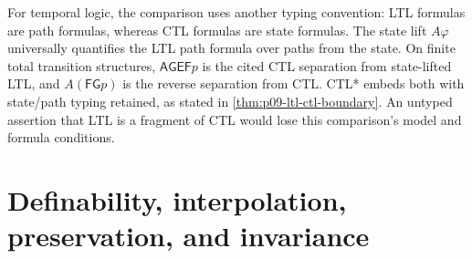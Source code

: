 For temporal logic, the comparison uses another typing convention:
LTL formulas are path formulas, whereas CTL formulas are state formulas.
The state lift \(A\varphi\) universally quantifies the LTL path formula
over paths from the state. On finite total transition structures,
\(\mathsf{AG}\mathsf{EF}p\) is the cited CTL separation from state-lifted
LTL, and \(A(\mathsf F\mathsf Gp)\) is the reverse separation from CTL.
CTL* embeds both with state/path typing retained, as stated in
\cref{thm:p09-ltl-ctl-boundary}\cite{EmersonHalpern1986}.
An untyped assertion that LTL is a fragment of CTL would lose this comparison's
model and formula conditions.

\section{Definability, interpolation, preservation, and invariance}
\label{sec:p14-translation-definability-invariance}

